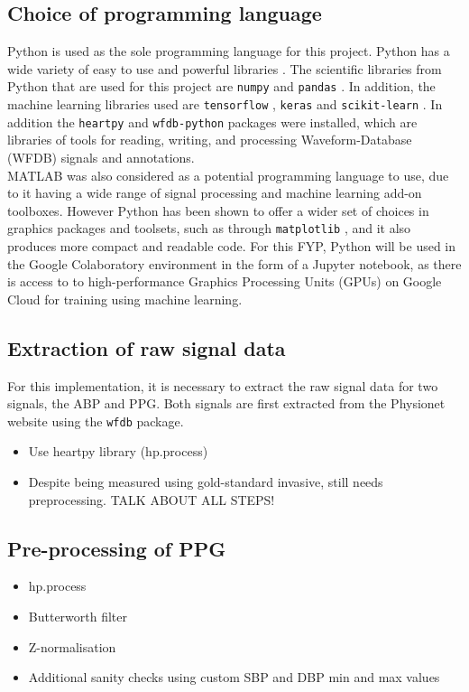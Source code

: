 \subsection{Choice of programming language}
Python is used as the sole programming language for this project. Python has a wide 
variety of easy to use and powerful libraries \cite{Python}. The scientific libraries from Python 
that are used for this project are \texttt{numpy} \cite{numpy} and \texttt{pandas} \cite{pandas}. In addition, the 
machine learning libraries used are \texttt{tensorflow} \cite{tensorflow}, \texttt{keras} \cite{keras} and \texttt{scikit-learn} \cite{scikit}. 
In addition the \texttt{heartpy} \cite{heartpy} and \texttt{wfdb-python} \cite{wfdb} packages were installed, which are libraries of 
tools for reading, writing, and processing Waveform-Database (WFDB) signals and annotations. \\ \newline \noindent MATLAB was also 
considered as a potential programming language to use, due to it having a wide range of 
signal processing and machine learning add-on toolboxes. However Python has been shown 
to offer a wider set of choices in graphics packages and toolsets, such as 
through \texttt{matplotlib} \cite{matplotlib}, and it also produces more compact and readable 
code. For this FYP, Python will be used in the Google Colaboratory environment in the form of a Jupyter notebook, as there is access to 
to high-performance Graphics Processing Units (GPUs) on Google Cloud for training using machine learning. 


\subsection{Extraction of raw signal data}
For this implementation, it is necessary to extract the raw signal data 
for two signals, the ABP and PPG. Both signals are first extracted from 
the Physionet website using the \texttt{wfdb} package.
\begin{itemize}
    \item Use heartpy library (hp.process)
    \item Despite being measured using gold-standard invasive, still needs preprocessing. TALK ABOUT ALL STEPS!
\end{itemize}


\subsection{Pre-processing of PPG}
\begin{itemize}
    \item hp.process
    \item Butterworth filter
    \item Z-normalisation
    \item Additional sanity checks using custom SBP and DBP min and max values
\end{itemize}

